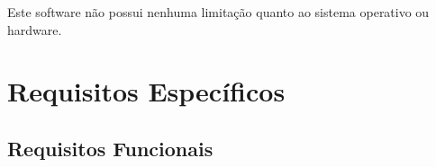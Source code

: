 \documentclass[12pt,a4paper,onecolumn,titlepage]{article}
\begin{document}
Este software não possui nenhuma limitação quanto ao sistema operativo ou hardware.

\section{Requisitos Específicos}
\label{sect:requisitos}



\subsection{Requisitos Funcionais}
\end{document}
